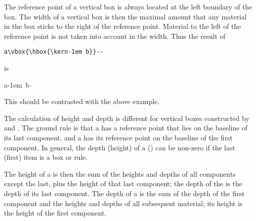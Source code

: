 \documentclass{book}
\begin{document}
The  reference point of a vertical box
is always located at the left boundary of the box.
The width of a vertical box
is then the maximal amount that any material in the
box sticks to the right of the reference point.
Material to the left of the reference point is
not taken into account in the width.
Thus the result of
\begin{disp}\verb>a\vbox{\hbox{\kern-1em b}}-->\end{disp}
is
\begin{disp}\leavevmode\hphantom{b}a\vbox{\hbox{\kern-1em b}}--\end{disp}
This should be contrasted with the above example.


The calculation of height and depth is different
for vertical boxes constructed by  and .
The ground rule is that
a  has a reference point that lies on
the baseline of its last component,
and a  has its reference point on the baseline of the
first component.
In general, the depth (height) of a  ()
\alt
can be non-zero if the last (first) item is a box or rule.

The height of a  is then the sum of the heights and
depths of all components except the last, plus the height
of that last component; the depth of the  is the
depth of its last component.
The depth of a 
is the sum of the depth of the first component and the heights
and depths of all subsequent material; its height is the
height of the first component.
\end{document}

